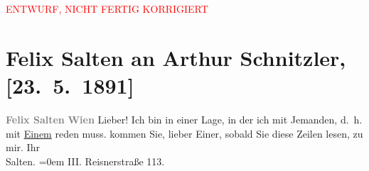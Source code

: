
\begin{center}
            \textcolor{red}{ENTWURF, NICHT FERTIG KORRIGIERT}
                      \end{center}
            
         \renewcommand{\erwaehnteOrte}{Orte: Reisnerstraße, Wien}
         \renewcommand{\erwaehnteWerke}{}
               \section[Felix Salten an Arthur Schnitzler, {[}23. 5. 1891{]}]{ Felix Salten an Arthur Schnitzler, {[}23. 5. 1891{]}}\nopagebreak{}\rehead{ }\begin{ledgroupsized}[t]{13cm}\normalsize\beginnumbering \toendnotes[C]{\smallbreak\pagebreak[2]} 
\pstart
           \noindent{}\centering{}{\pb}\textcolor{gray}{\textbf{\textcolor{gray}{\textbf{Felix Salten}}}}\textcolor{gray}{\textbf{}}\pend
           \pstart
           \noindent{}\textcolor{gray}{\textbf{\textcolor{gray}{\textbf{Wien}}}}\pend
           \pstart
           {\pb}Lieber! Ich bin in einer Lage, in der ich mit Jemanden, d. h. mit
                  \uline{Einem} reden muss.  kommen Sie, lieber Einer, sobald Sie diese Zeilen lesen, zu mir.\pend
           \pstart
           Ihr{\\[\baselineskip]}\spacefill\mbox{Salten.}\pend
           \leftskip=0em{}\pstart
           \noindent{}III. Reisnerstraße 113. \pend
           
         
         \endnumbering{}\end{ledgroupsized}\begin{anhang}\end{anhang}\newcommand{\dateiname}{L03102}\newcommand{\titel}{Felix Salten an Arthur Schnitzler, [23. 5. 1891]}\newcommand{\editorInnen}{Martin Anton Müller und Laura Untner}
      